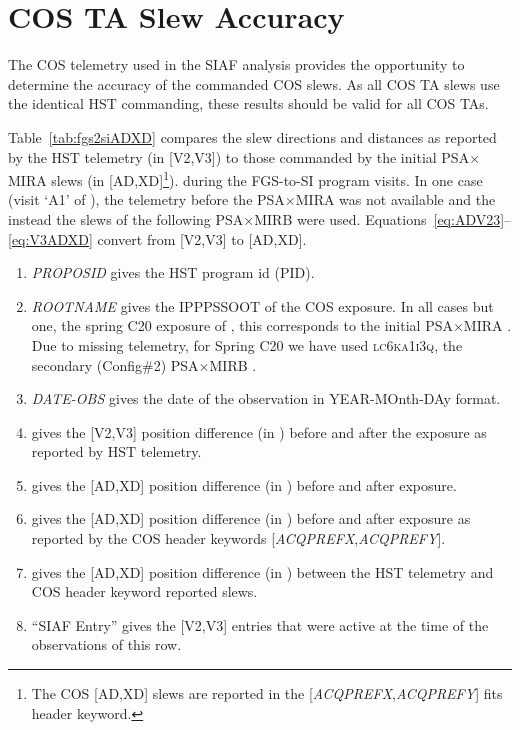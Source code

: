 \section{COS TA Slew Accuracy}\label{sec:slewaccuracy}
The COS telemetry used in the SIAF analysis provides the opportunity to
determine the accuracy of the commanded COS  slews. As all
COS TA slews use the identical HST commanding, these results should be valid
for all COS TAs.

Table~\ref{tab:fgs2siADXD} compares the slew directions and distances as
reported by the HST telemetry (in [V2,V3]) to those commanded by the initial PSA$\times$MIRA
 slews (in [AD,XD]\footnote{The COS [AD,XD] slews are reported in the [\textit{ACQPREFX},\textit{ACQPREFY}] fits header keyword.}). during the FGS-to-SI program visits.
In one case (visit `A1' of ), the telemetry before the PSA$\times$MIRA
 was not available and the instead the slews of the following PSA$\times$MIRB
 were used. Equations~\ref{eq:ADV23}--\ref{eq:V3ADXD} convert from [V2,V3] to [AD,XD].

\footnotesize
\begin{enumerate}
\item \textit{PROPOSID} gives the HST program id (PID).
\item \textit{ROOTNAME} gives the IPPPSSOOT of the COS exposure. In all cases but one, the spring C20 exposure of ,
this corresponds to the initial PSA$\times$MIRA . Due to missing telemetry,
for Spring C20 we have used \textsc{lc6ka1i3q}, the secondary (Config\#2) PSA$\times$MIRB .
\item \textit{DATE-OBS} gives the date of the observation in YEAR-MOnth-DAy format.
\item gives the [V2,V3] position difference (in \arcsec) before and after the  exposure as reported by HST telemetry.
\item gives the [AD,XD] position difference (in \arcsec) before and after  exposure.
\item gives the [AD,XD] position difference (in \arcsec) before and after  exposure as reported by the COS header keywords [\textit{ACQPREFX},\textit{ACQPREFY}].
\item gives the [AD,XD] position difference (in \arcsec) between the HST telemetry and COS header keyword
reported slews.
\item ``SIAF Entry'' gives the [V2,V3] entries that were active at the time of the observations of this row.\end{enumerate}
\normalsize

